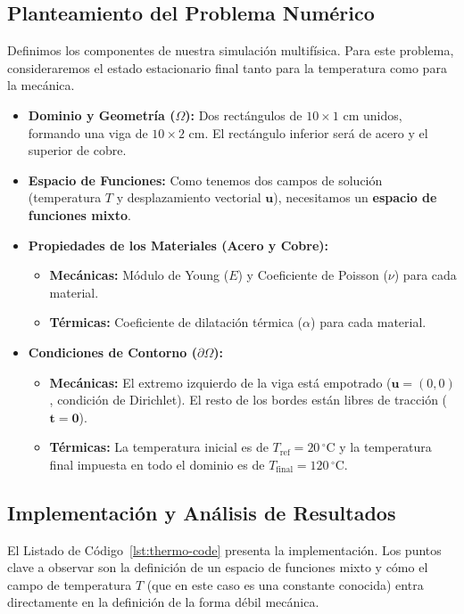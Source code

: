 \subsection{Planteamiento del Problema Numérico}
Definimos los componentes de nuestra simulación multifísica. Para este problema, consideraremos el estado estacionario final tanto para la temperatura como para la mecánica.
\begin{itemize}
    \item \textbf{Dominio y Geometría (\(\Omega\)):} Dos rectángulos de \(10 \times 1\) cm unidos, formando una viga de \(10 \times 2\) cm. El rectángulo inferior será de acero y el superior de cobre.
    \item \textbf{Espacio de Funciones:} Como tenemos dos campos de solución (temperatura \(T\) y desplazamiento vectorial \(\bm{u}\)), necesitamos un \textbf{espacio de funciones mixto}.
    \item \textbf{Propiedades de los Materiales (Acero y Cobre):}
    \begin{itemize}
        \item \textbf{Mecánicas:} Módulo de Young (\(E\)) y Coeficiente de Poisson (\(\nu\)) para cada material.
        \item \textbf{Térmicas:} Coeficiente de dilatación térmica (\(\alpha\)) para cada material.
    \end{itemize}
    \item \textbf{Condiciones de Contorno (\(\partial\Omega\)):}
    \begin{itemize}
        \item \textbf{Mecánicas:} El extremo izquierdo de la viga está empotrado (\(\bm{u} = (0,0)\), condición de Dirichlet). El resto de los bordes están libres de tracción (\(\bm{t}=\bm{0}\)).
        \item \textbf{Térmicas:} La temperatura inicial es de \(T_{\text{ref}} = 20 \, ^\circ\text{C}\) y la temperatura final impuesta en todo el dominio es de \(T_{\text{final}} = 120 \, ^\circ\text{C}\).
    \end{itemize}
\end{itemize}

\subsection{Implementación y Análisis de Resultados}
El Listado de Código~\ref{lst:thermo-code} presenta la implementación. Los puntos clave a observar son la definición de un espacio de funciones mixto y cómo el campo de temperatura \(T\) (que en este caso es una constante conocida) entra directamente en la definición de la forma débil mecánica.

